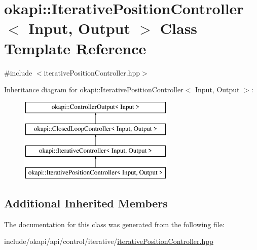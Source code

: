 \hypertarget{classokapi_1_1IterativePositionController}{}\section{okapi\+::Iterative\+Position\+Controller$<$ Input, Output $>$ Class Template Reference}
\label{classokapi_1_1IterativePositionController}


{\ttfamily \#include $<$iterative\+Position\+Controller.\+hpp$>$}

Inheritance diagram for okapi\+::Iterative\+Position\+Controller$<$ Input, Output $>$\+:\begin{figure}[H]
\begin{center}
\leavevmode
\includegraphics[height=4.000000cm]{classokapi_1_1IterativePositionController}
\end{center}
\end{figure}
\subsection*{Additional Inherited Members}


The documentation for this class was generated from the following file\+:\begin{DoxyCompactItemize}
\item 
include/okapi/api/control/iterative/\mbox{\hyperlink{iterativePositionController_8hpp}{iterative\+Position\+Controller.\+hpp}}\end{DoxyCompactItemize}
